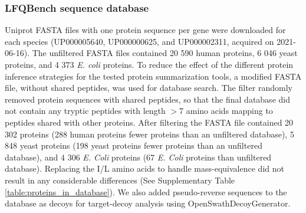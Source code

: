 \documentclass[10pt,letterpaper]{article}
\begin{document}
\subsubsection*{LFQBench sequence database}

Uniprot FASTA files with one protein sequence per gene were downloaded for each species (UP000005640, UP000000625, and UP000002311, acquired on 2021-06-16). The unfiltered FASTA files contained 20 590 human proteins, 6 046 yeast proteins, and 4 373 \textit{E. coli} proteins. To reduce the effect of the different protein inference strategies for the tested protein summarization tools, a modified FASTA file, without shared peptides, was used for database search. The filter randomly removed protein sequences with shared peptides, so that the final database did not contain any tryptic peptides with length $>$7 amino acids mapping to peptides shared with other proteins. After filtering the FASTA file contained 20 302 proteins (288 human proteins fewer proteins than an unfiltered database), 5 848 yeast proteins (198 yeast proteins fewer proteins than an unfiltered database), and 4 306 \textit{E. Coli} proteins (67 \textit{E. Coli} proteins than unfiltered database). Replacing the I/L amino acids to handle mass-equivalence did not result in any considerable differences (See Supplementary Table \ref{table:proteins_in_database}). We also added pseudo-reverse sequences to the database as decoys for target-decoy analysis using OpenSwathDecoyGenerator. 

\end{document}
